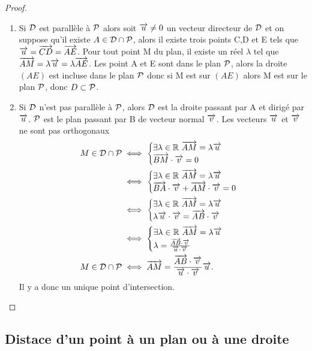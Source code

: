 \begin{proof}
  \begin{enumerate}
  \item Si $\Dr$ est parallèle à $\P$ alors soit $\vu\neq 0$ un vecteur directeur de $\Dr$ et on suppose qu'il existe $A\in\Dr\cap\P$, alors il existe trois points C,D et E tels que $\vu=\vect{CD}=\vect{AE}$. Pour tout point M du plan, il existe un réel $\lambda$ tel que $\vect{AM}=\lambda\vu=\lambda\vect{AE}$. Les point A et E sont dans le plan $\P$, alors la droite $(AE)$ est incluse dans le plan $\P$ donc si M est sur $(AE)$ alors M est sur le plan $\P$, donc $D \subset \P$.
  \item Si $\Dr$ n'est pas parallèle à $\P$, alors $\Dr$ est la droite passant par A et dirigé par $\vu$. $\P$ est le plan passant par B de vecteur normal $\vv$. Les vecteurs $\vu$ et $\vv$ ne sont pas orthogonaux
    \begin{align}
      M \in \Dr\cap\P &\iff \begin{cases} \exists \lambda \in \R \ \vect{AM}=\lambda\vu \\ \vect{BM}\cdot\vv=0\end{cases} \\
      &\iff \begin{cases} \exists \lambda \in \R \ \vect{AM}=\lambda\vu \\ \vect{BA}\cdot\vv+\vect{AM}\cdot\vv=0\end{cases}\\
      &\iff \begin{cases} \exists \lambda \in \R \ \vect{AM}=\lambda\vu \\ \lambda\vu\cdot\vv=\vect{AB}\cdot\vv\end{cases}\\
      &\iff \begin{cases} \exists \lambda \in \R \ \vect{AM}=\lambda\vu \\\lambda=\frac{\vect{AB}\cdot\vv}{\vu\cdot\vv}\end{cases}\\
      M \in \Dr\cap\P &\iff \vect{AM}=\frac{\vect{AB}\cdot\vv}{\vu\cdot\vv}\vu.
    \end{align}
Il y a donc un unique point d'intersection.
  \end{enumerate}
\end{proof}

\subsection{Distace d'un point à un plan ou à une droite}
